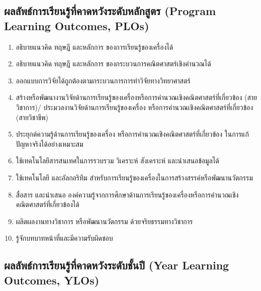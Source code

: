 \subsection{ผลลัพธ์การเรียนรู้ที่คาดหวังระดับหลักสูตร (Program Learning Outcomes, PLOs)}
\begin{enumerate}[label=PLO\arabic*., leftmargin=3\parindent]
	\item อธิบายแนวคิด ทฤษฎี และหลักการ ของการเรียนรู้ของเครื่องได้
	\item อธิบายแนวคิด ทฤษฎี และหลักการ ของกระบวนการคณิตศาสตร์เชิงคำนวณได้
	\item ออกแบบการวิจัยได้ถูกต้องตามกระบวนการการทำวิจัยทางวิทยาศาสตร์ 
	\item สร้างหรือพัฒนางานวิจัยด้านการเรียนรู้ของเครื่องหรือการคำนวณเชิงคณิตศาสตร์ที่เกี่ยวข้อง (สายวิชาการ)/ ประมวลงานวิจัยด้านการเรียนรู้ของเครื่อง หรือการคำนวณเชิงคณิตศาสตร์ที่เกี่ยวข้อง (สายวิชาชีพ) 
	\item ประยุกต์ความรู้ด้านการเรียนรู้ของเครื่อง หรือการคำนวณเชิงคณิตศาสตร์ที่เกี่ยวข้อง ในการแก้ปัญหาจริงได้อย่างเหมาะสม
	\item ใช้เทคโนโลยีสารสนเทศในการรวบรวม วิเคราะห์ สังเคราะห์ และนำเสนอข้อมูลได้
	\item ใช้เทคโนโลยี และอัลกอริทึม สำหรับการเรียนรู้ของเครื่องในการสร้างสรรค์หรือพัฒนานวัตกรรม
	\item สื่อสาร และนำเสนอ องค์ความรู้จากการศึกษาด้านการเรียนรู้ของเครื่องหรือการคำนวณเชิงคณิตศาสตร์ที่เกี่ยวข้องได้
	\item ผลิตผลงานทางวิชาการ หรือพัฒนานวัตกรรม ด้วยจริยธรรมทางวิชาการ
	\item รู้จักบทบาทหน้าที่และมีความรับผิดชอบ
\end{enumerate}

\subsection{ผลลัพธ์การเรียนรู้ที่คาดหวังระดับชั้นปี  (Year Learning Outcomes, YLOs)}

